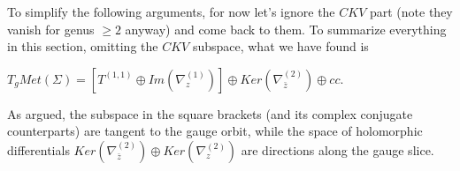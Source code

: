     To simplify the following arguments, for now let's ignore the $CKV$ part (note they vanish for genus $\ge 2$ anyway) and come back to them. To summarize everything in this section, omitting the $CKV$ subspace, what we have found is

    \begin{prop}
        $T_g Met(\Sigma) = [ T^{(1,1)} \oplus Im(\nabla^{(1)}_z) ] \oplus Ker(\nabla^{(2)}_{\bar z})\oplus cc.$
    \end{prop}

    As argued, the subspace in the square brackets (and its complex conjugate counterparts) are tangent to the gauge orbit, while the space of holomorphic differentials $Ker(\nabla^{(2)}_{\bar z})\oplus Ker(\nabla^{(2)}_{z})$ are directions along the gauge slice.
